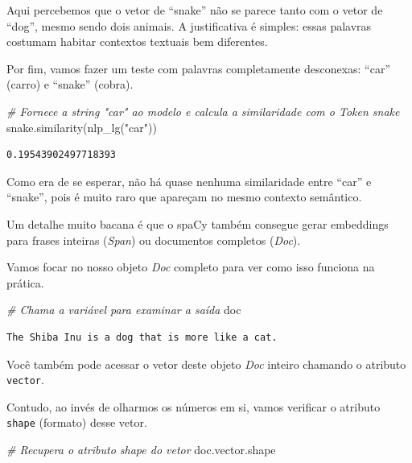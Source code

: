 \documentclass[
  brazilian,
]{article}
\newenvironment{Shaded}{}{}
\newcommand{\CommentTok}[1]{\textcolor[rgb]{0.38,0.63,0.69}{\textit{#1}}}
\newcommand{\NormalTok}[1]{#1}
\newcommand{\StringTok}[1]{\textcolor[rgb]{0.25,0.44,0.63}{#1}}
\begin{document}
Aqui percebemos que o vetor de ``snake'' não se parece tanto com o vetor
de ``dog'', mesmo sendo dois animais. A justificativa é simples: essas
palavras costumam habitar contextos textuais bem diferentes.

Por fim, vamos fazer um teste com palavras completamente desconexas:
``car'' (carro) e ``snake'' (cobra).

\begin{Shaded}
\begin{Highlighting}[]
\CommentTok{\# Fornece a string "car" ao modelo e calcula a similaridade com o Token \textquotesingle{}snake\textquotesingle{}}
\NormalTok{snake.similarity(nlp\_lg(}\StringTok{"car"}\NormalTok{))}
\end{Highlighting}
\end{Shaded}

\begin{verbatim}
0.19543902497718393
\end{verbatim}

Como era de se esperar, não há quase nenhuma similaridade entre ``car''
e ``snake'', pois é muito raro que apareçam no mesmo contexto semântico.

Um detalhe muito bacana é que o spaCy também consegue gerar embeddings
para frases inteiras (\emph{Span}) ou documentos completos (\emph{Doc}).

Vamos focar no nosso objeto \emph{Doc} completo para ver como isso
funciona na prática.

\begin{Shaded}
\begin{Highlighting}[]
\CommentTok{\# Chama a variável para examinar a saída}
\NormalTok{doc}
\end{Highlighting}
\end{Shaded}

\begin{verbatim}
The Shiba Inu is a dog that is more like a cat.
\end{verbatim}

Você também pode acessar o vetor deste objeto \emph{Doc} inteiro
chamando o atributo \texttt{vector}.

Contudo, ao invés de olharmos os números em si, vamos verificar o
atributo \texttt{shape} (formato) desse vetor.

\begin{Shaded}
\begin{Highlighting}[]
\CommentTok{\# Recupera o atributo \textquotesingle{}shape\textquotesingle{} do vetor}
\NormalTok{doc.vector.shape}
\end{Highlighting}
\end{Shaded}
\end{document}
